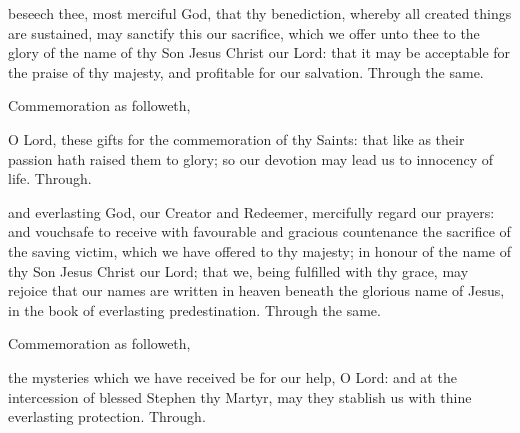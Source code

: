 \secret
{} beseech thee, most merciful God, that thy benediction, whereby all created things are sustained, may sanctify this our sacrifice, which we offer unto thee to the glory of the name of thy Son Jesus Christ our Lord: that it may be acceptable for the praise of thy majesty, and profitable for our salvation. Through the same.
\begin{rubric}
	Commemoration  as followeth,
\end{rubric}
 O Lord, these gifts for the commemoration of thy Saints: that like as their passion hath raised them to glory; so our devotion may lead us to innocency of life. Through.


\postcommunion
{} and everlasting God, our Creator and Redeemer, mercifully regard our prayers: and vouchsafe to receive with favourable and gracious countenance the sacrifice of the saving victim, which we have offered to thy majesty; in honour of the name of thy Son Jesus Christ our Lord; that we, being fulfilled with thy grace, may rejoice that our names are written in heaven beneath the glorious name of Jesus, in the book of everlasting predestination. Through the same.
\begin{rubric}
	Commemoration  as followeth,
\end{rubric}
 the mysteries which we have received be for our help, O Lord: and at the intercession of blessed Stephen thy Martyr, may they stablish us with thine everlasting protection. Through.


\clearpage
{}
\fancyhead[RE,LO]{}

